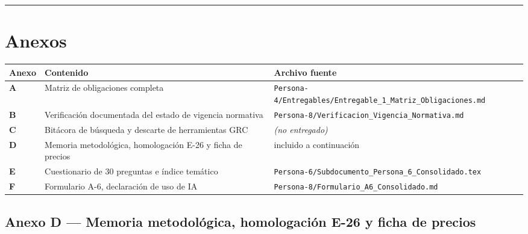 \begin{center}\rule{0.5\linewidth}{0.5pt}\end{center}

\section{Anexos}\label{anexos}

{\def\LTcaptype{none} %
\begin{longtable}[]{@{}
  >{\centering\arraybackslash}p{}
  >{\raggedright\arraybackslash}p{}
  >{\raggedright\arraybackslash}p{}@{}}
\toprule\noalign{}
\begin{minipage}[b]{\linewidth}\centering
Anexo
\end{minipage} & \begin{minipage}[b]{\linewidth}\raggedright
Contenido
\end{minipage} & \begin{minipage}[b]{\linewidth}\raggedright
Archivo fuente
\end{minipage} \\
\midrule\noalign{}
\endhead
\bottomrule\noalign{}
\endlastfoot
\textbf{A} & Matriz de obligaciones completa & \texttt{Persona-4/Entregables/Entregable\_1\_Matriz\_Obligaciones.md} \\
\textbf{B} & Verificación documentada del estado de vigencia normativa & \texttt{Persona-8/Verificacion\_Vigencia\_Normativa.md} \\
\textbf{C} & Bitácora de búsqueda y descarte de herramientas GRC & \emph{(no entregado)} \\
\textbf{D} & Memoria metodológica, homologación E-26 y ficha de precios & incluido a continuación \\
\textbf{E} & Cuestionario de 30 preguntas e índice temático & \texttt{Persona-6/Subdocumento\_Persona\_6\_Consolidado.tex} \\
\textbf{F} & Formulario A-6, declaración de uso de IA & \texttt{Persona-8/Formulario\_A6\_Consolidado.md} \\
\end{longtable}
}

\subsection{Anexo D --- Memoria metodológica, homologación E-26 y ficha de precios}\label{anexo-d-memoria-metodoluxf3gica-homologaciuxf3n-e-26-y-ficha-de-precios}

